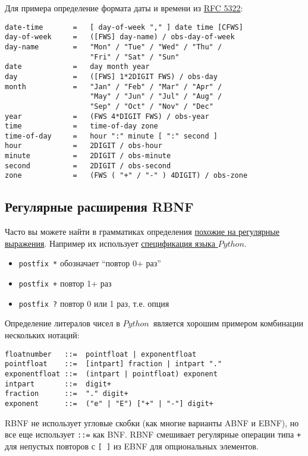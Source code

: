 \documentclass[oneside,10pt]{article}
\newcommand{\py}{$Python$}
\begin{document}
\clearpage
Для примера определение формата даты и времени из
\href{http://tools.ietf.org/html/rfc5322#section-1.2}{RFC 5322}:
\begin{verbatim}
date-time       =   [ day-of-week "," ] date time [CFWS]
day-of-week     =   ([FWS] day-name) / obs-day-of-week
day-name        =   "Mon" / "Tue" / "Wed" / "Thu" /
                    "Fri" / "Sat" / "Sun"
date            =   day month year
day             =   ([FWS] 1*2DIGIT FWS) / obs-day
month           =   "Jan" / "Feb" / "Mar" / "Apr" /
                    "May" / "Jun" / "Jul" / "Aug" /
                    "Sep" / "Oct" / "Nov" / "Dec"
year            =   (FWS 4*DIGIT FWS) / obs-year
time            =   time-of-day zone
time-of-day     =   hour ":" minute [ ":" second ]
hour            =   2DIGIT / obs-hour
minute          =   2DIGIT / obs-minute
second          =   2DIGIT / obs-second
zone            =   (FWS ( "+" / "-" ) 4DIGIT) / obs-zone
\end{verbatim}

\clearpage
\subsection{Регулярные расширения RBNF}

Часто вы можете найти в грамматиках определения
\href{http://matt.might.net/articles/sculpting-text/}{похожие на регулярные
выражения}.
Например их использует
\href{http://docs.python.org/3/reference/lexical_analysis.html}{спецификация
языка \py}.

\begin{itemize}[nosep]
  \item \verb|postfix *| обозначает ``повтор 0+ раз''
  \item \verb|postfix +| повтор 1+ раз
  \item \verb|postfix ?| повтор 0 или 1 раз, т.е. опция
\end{itemize}

Определение литералов чисел в \py\ является хорошим примером комбинации
нескольких нотаций:
\begin{verbatim}
floatnumber   ::=  pointfloat | exponentfloat
pointfloat    ::=  [intpart] fraction | intpart "."
exponentfloat ::=  (intpart | pointfloat) exponent
intpart       ::=  digit+
fraction      ::=  "." digit+
exponent      ::=  ("e" | "E") ["+" | "-"] digit+
\end{verbatim}

RBNF не использует угловые скобки (как многие варианты ABNF и EBNF), но
все еще использует \verb|::=| как BNF. RBNF смешивает регулярные операции типа
\verb|+| для непустых повторов с \verb|[ ]| из EBNF для опциональных элементов.
\end{document}
